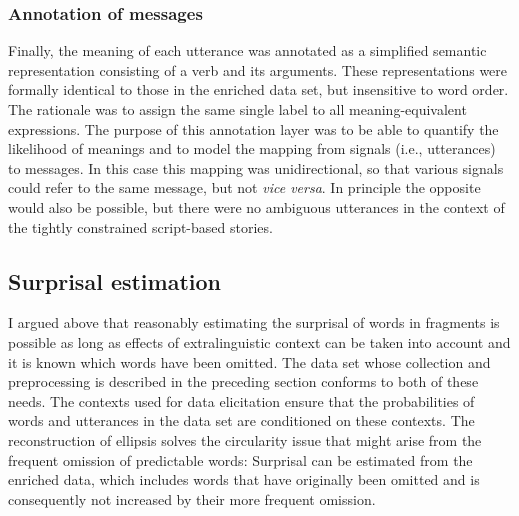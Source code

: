 \subsubsection{Annotation of messages}
Finally, the meaning of each utterance was annotated as a simplified semantic representation consisting of a verb and its arguments. These representations were formally identical to those in the enriched data set, but insensitive to word order. The rationale was to assign the same single label to all meaning-equivalent expressions. The purpose of this annotation layer was to be able to quantify the likelihood of meanings and to model the mapping from signals (i.e., utterances) to messages. In this case this mapping was unidirectional, so that various signals could refer to the same message, but not \textit{vice versa}. In principle the opposite would also be possible, but there were no ambiguous utterances in the context of the tightly constrained script-based stories. 

\subsection{Surprisal estimation}
\label{sec:scripts-production-surprisal}

I argued above that reasonably estimating the surprisal of words in fragments is possible as long as effects of extralinguistic context can be taken into account and it is known which words have been omitted. The data set whose collection and preprocessing is described in the preceding section conforms to both of these needs. The contexts used for data elicitation ensure that the probabilities of words and utterances in the data set are conditioned on these contexts. The reconstruction of ellipsis solves the circularity issue that might arise from the frequent omission of predictable words: Surprisal can be estimated from the enriched data, which includes words that have originally been omitted and is consequently not increased by their more frequent omission.

